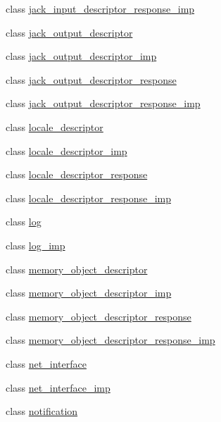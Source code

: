 \begin{DoxyCompactItemize}
class \hyperlink{classavdecc__lib_1_1jack__input__descriptor__response__imp}{jack\+\_\+input\+\_\+descriptor\+\_\+response\+\_\+imp}
\item 
class \hyperlink{classavdecc__lib_1_1jack__output__descriptor}{jack\+\_\+output\+\_\+descriptor}
\item 
class \hyperlink{classavdecc__lib_1_1jack__output__descriptor__imp}{jack\+\_\+output\+\_\+descriptor\+\_\+imp}
\item 
class \hyperlink{classavdecc__lib_1_1jack__output__descriptor__response}{jack\+\_\+output\+\_\+descriptor\+\_\+response}
\item 
class \hyperlink{classavdecc__lib_1_1jack__output__descriptor__response__imp}{jack\+\_\+output\+\_\+descriptor\+\_\+response\+\_\+imp}
\item 
class \hyperlink{classavdecc__lib_1_1locale__descriptor}{locale\+\_\+descriptor}
\item 
class \hyperlink{classavdecc__lib_1_1locale__descriptor__imp}{locale\+\_\+descriptor\+\_\+imp}
\item 
class \hyperlink{classavdecc__lib_1_1locale__descriptor__response}{locale\+\_\+descriptor\+\_\+response}
\item 
class \hyperlink{classavdecc__lib_1_1locale__descriptor__response__imp}{locale\+\_\+descriptor\+\_\+response\+\_\+imp}
\item 
class \hyperlink{classavdecc__lib_1_1log}{log}
\item 
class \hyperlink{classavdecc__lib_1_1log__imp}{log\+\_\+imp}
\item 
class \hyperlink{classavdecc__lib_1_1memory__object__descriptor}{memory\+\_\+object\+\_\+descriptor}
\item 
class \hyperlink{classavdecc__lib_1_1memory__object__descriptor__imp}{memory\+\_\+object\+\_\+descriptor\+\_\+imp}
\item 
class \hyperlink{classavdecc__lib_1_1memory__object__descriptor__response}{memory\+\_\+object\+\_\+descriptor\+\_\+response}
\item 
class \hyperlink{classavdecc__lib_1_1memory__object__descriptor__response__imp}{memory\+\_\+object\+\_\+descriptor\+\_\+response\+\_\+imp}
\item 
class \hyperlink{classavdecc__lib_1_1net__interface}{net\+\_\+interface}
\item 
class \hyperlink{classavdecc__lib_1_1net__interface__imp}{net\+\_\+interface\+\_\+imp}
\item 
class \hyperlink{classavdecc__lib_1_1notification}{notification}

\end{DoxyCompactItemize}
